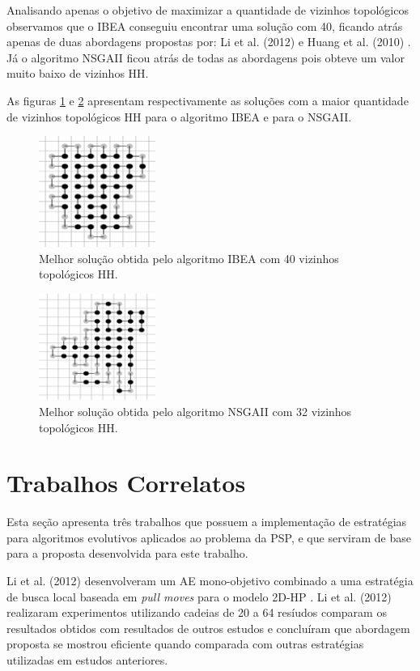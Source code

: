 \documentclass[conference]{IEEEtran}
\begin{document}
Analisando apenas o objetivo de maximizar a quantidade de vizinhos topológicos observamos que o IBEA conseguiu encontrar uma solução com 40, ficando atrás apenas de duas abordagens propostas por: Li et al. (2012) \cite{li2012genetic} e Huang et al. (2010) \cite{huang2010protein}. Já o algoritmo NSGAII ficou atrás de todas as abordagens pois obteve um valor muito baixo de vizinhos HH.


As figuras \ref{bestSolutionIBEA} e \ref{bestSolutionNSGAII} apresentam respectivamente as soluções com a maior quantidade de vizinhos topológicos HH para o algoritmo IBEA e para o NSGAII.

\begin{figure}[ht]
	\centering
	\includegraphics[width=1.5in]{ibeabestresults.png}
	\caption{Melhor solução obtida pelo algoritmo IBEA com 40 vizinhos topológicos HH.}
	\label{bestSolutionIBEA}
\end{figure}


\begin{figure}[ht]
	\centering
	\includegraphics[width=1.5in]{nsgaiibestresults.png}
	\caption{Melhor solução obtida pelo algoritmo NSGAII com 32 vizinhos topológicos HH.}
	\label{bestSolutionNSGAII}
\end{figure}

\section{Trabalhos Correlatos}
Esta seção apresenta três trabalhos que possuem a
implementação de estratégias para algoritmos evolutivos
aplicados ao problema da PSP, e que serviram de base
para a proposta desenvolvida para este trabalho.

Li et al. (2012) \cite{li2012genetic} desenvolveram um AE mono-objetivo combinado a uma estratégia de busca local baseada em \textit{pull moves} para o modelo 2D-HP \cite{lesh2003complete}. Li et al. (2012) realizaram experimentos utilizando cadeias de 20 a 64 resíudos comparam os resultados obtidos com resultados de outros estudos e concluíram que abordagem proposta se mostrou eficiente quando comparada com outras estratégias utilizadas em estudos anteriores.
\end{document}
